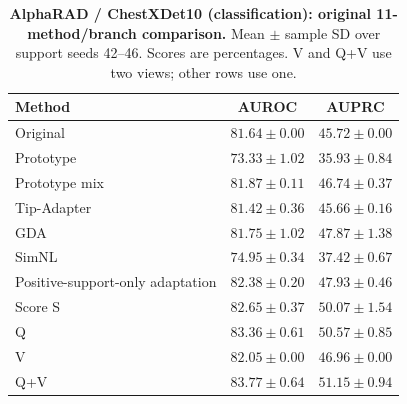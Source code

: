 \begin{table}[tp]
\centering
\caption{\textbf{AlphaRAD / ChestXDet10 (classification): original 11-method/branch comparison.} Mean $\pm$ sample SD over support seeds 42--46. Scores are percentages. V and Q+V use two views; other rows use one.}
\label{tab:supp-oldmeans-alpharad-chestxdet10}
\small
\setlength{\tabcolsep}{4pt}
\begin{tabular*}{\textwidth}{@{\extracolsep{\fill}}lcc@{}}
\toprule
Method & AUROC & AUPRC \\
\midrule
Original & $81.64\pm0.00$ & $45.72\pm0.00$ \\
Prototype & $73.33\pm1.02$ & $35.93\pm0.84$ \\
Prototype mix & $81.87\pm0.11$ & $46.74\pm0.37$ \\
Tip-Adapter & $81.42\pm0.36$ & $45.66\pm0.16$ \\
GDA & $81.75\pm1.02$ & $47.87\pm1.38$ \\
SimNL & $74.95\pm0.34$ & $37.42\pm0.67$ \\
Positive-support-only adaptation & $82.38\pm0.20$ & $47.93\pm0.46$ \\
Score S & $82.65\pm0.37$ & $50.07\pm1.54$ \\
Q & $83.36\pm0.61$ & $50.57\pm0.85$ \\
V & $82.05\pm0.00$ & $46.96\pm0.00$ \\
Q+V & $83.77\pm0.64$ & $51.15\pm0.94$ \\
\bottomrule
\end{tabular*}
\end{table}
